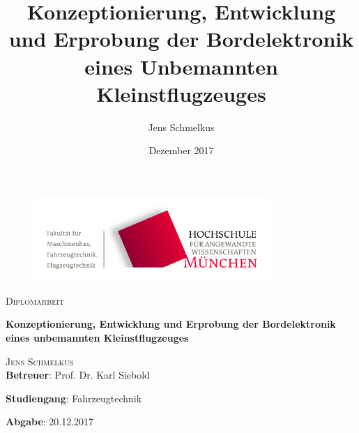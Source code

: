 \begin{titlepage}
\setcounter{page}{1}
\begin{center}
\begin{figure}[h!]
\vspace{0cm}
\centering
\includegraphics[width=0.8\textwidth]{bilder/Logos/FK03_CMYK_Block.png}
\\[0.8cm]
\end{figure}
\vspace{1.5cm}

{\fontsize{20}{60}\scshape Diplomarbeit} 
\\[1.1cm]

\begin{doublespace}
{\fontsize{30}{22}\selectfont \textbf{Konzeptionierung, Entwicklung und Erprobung der Bordelektronik eines unbemannten Kleinstflugzeuges}\par} 
\vspace{1.4cm}
\end{doublespace}

\title{Konzeptionierung, Entwicklung und Erprobung der Bordelektronik eines Unbemannten Kleinstflugzeuges}
\author{Jens Schmelkus}
\date{Dezember 2017}

{\fontsize{23}{60}\scshape Jens Schmelkus} 
\\[2.0cm]


\textbf{Betreuer}: Prof. Dr. Karl Siebold




\textbf{Studiengang}: Fahrzeugtechnik 

\textbf{Abgabe}: 20.12.2017

\vfill


\end{center}
\end{titlepage}
